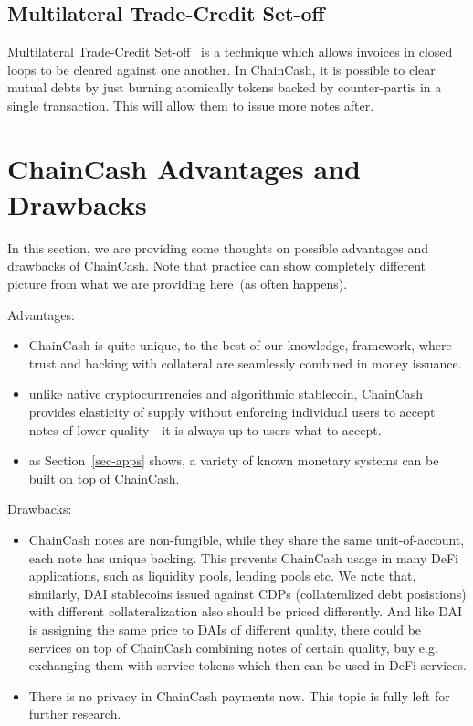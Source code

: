 \documentclass{article}   %
\newcommand{\cc}{ChainCash}
\begin{document}
\subsection{Multilateral Trade-Credit Set-off}

Multilateral Trade-Credit Set-off~\cite{mtcs} is a technique which allows invoices in closed loops to be cleared against one another.
In \cc{}, it is possible to clear mutual debts by just burning atomically tokens backed by counter-partis in a single
transaction. This will allow them to issue more notes after.

\section{\cc{} Advantages and Drawbacks}

In this section, we are providing some thoughts on possible advantages and drawbacks of \cc{}. Note that practice can show
completely different picture from what we are providing here~(as often happens).

Advantages:
\begin{itemize}
  \item ChainCash is quite unique, to the best of our knowledge, framework, where trust and backing with collateral are
   seamlessly combined in money issuance.
  \item unlike native cryptocurrrencies and algorithmic stablecoin, \cc{} provides elasticity of supply without enforcing
  individual users to accept notes of lower quality - it is always up to users what to accept.
  \item as Section~\ref{sec-apps} shows, a variety of known monetary systems can be built on top of \cc{}.
\end{itemize}

Drawbacks:
\begin{itemize}
  \item ChainCash notes are non-fungible, while they share the same unit-of-account, each note has unique backing. This prevents ChainCash usage
  in many DeFi applications, such as liquidity pools, lending pools etc. We note that, similarly, DAI stablecoins issued against CDPs
  (collateralized debt posistions) with different collateralization also should be priced differently. And like DAI is assigning the same price to
  DAIs of different quality, there could be services on top of \cc{} combining notes of certain quality, buy e.g. exchanging them with service tokens
  which then can be used in DeFi services.
  \item There is no privacy in \cc{} payments now. This topic is fully left for further research.
\end{itemize}


\newpage

 
\end{document}
